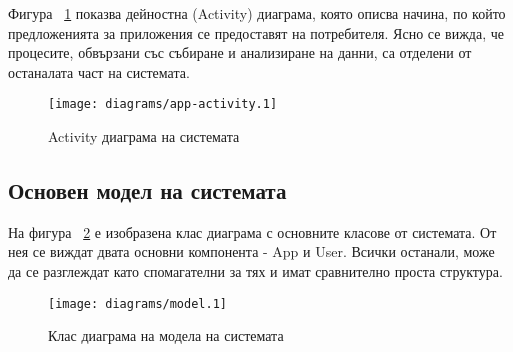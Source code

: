 	Фигура ~\ref{figure:app-activity} показва дейностна (Activity) диаграма, която описва начина, по който предложенията за приложения се предоставят на потребителя.
	Ясно се вижда, че процесите, обвързани със събиране и анализиране на данни, са отделени от останалата част на системата.
	
		\begin{figure}[htbp]
			\centering
 			\texttt{[image: diagrams/app-activity.1]}
			\caption{Activity диаграма на системата}
			\label{figure:app-activity}
		\end{figure}
	
	\subsection{Основен модел на системата}
	
		На фигура ~\ref{figure:model} е изобразена клас диаграма с основните класове от системата. От нея се виждат двата основни компонента - App и User. Всички останали, може да се разглеждат като спомагателни за тях и имат сравнително проста структура.
	
		\begin{figure}[htbp]
			\centering
 			\texttt{[image: diagrams/model.1]}
			\caption{Клас диаграма на модела на системата}
			\label{figure:model}
		\end{figure}
